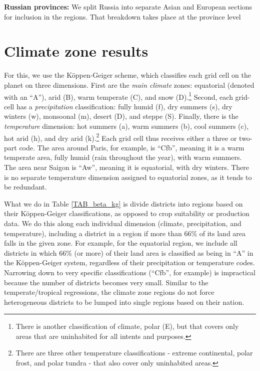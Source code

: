 \documentclass[11pt]{article}
\begin{document}
\noindent\textbf{Russian provinces:} We split Russia into separate Asian and European sections for inclusion in the regions. That breakdown takes place at the province level
\begin{itemize}
    \setlength\itemsep{0pt}
    
\end{itemize}

\section{Climate zone results}
For this, we use the K{\"o}ppen-Geiger scheme, which classifies each grid cell on the planet on three dimensions. First are the \textit{main climate} zones: equatorial (denoted with an ``A''), arid (B), warm temperate (C), and snow (D).\footnote{There is another classification of climate, polar (E), but that covers only areas that are uninhabited for all intents and purposes.} Second, each grid-cell has a \textit{precipitation} classification: fully humid (f), dry summers (s), dry winters (w), monsoonal (m), desert (D), and steppe (S). Finally, there is the \textit{temperature} dimension: hot summers (a), warm summers (b), cool summers (c), hot arid (h), and dry arid (k).\footnote{There are three other temperature classifications - extreme continental, polar frost, and polar tundra - that also cover only uninhabited areas.} Each grid cell thus receives either a three or two-part code. The area around Paris, for example, is ``Cfb'', meaning it is a warm temperate area, fully humid (rain throughout the year), with warm summers. The area near Saigon is ``Aw'', meaning it is equatorial, with dry winters. There is no separate temperature dimension assigned to equatorial zones, as it tends to be redundant.

What we do in Table \ref{TAB_beta_kg} is divide districts into regions based on their K{\"o}ppen-Geiger classifications, as opposed to crop suitability or production data. We do this along each individual dimension (climate, precipitation, and temperature), including a district in a region if more than 66\% of its land area falls in the given zone. For example, for the equatorial region, we include all districts in which 66\% (or more) of their land area is classified as being in ``A'' in the K{\"o}ppen-Geiger system, regardless of their precipitation or temperature codes. Narrowing down to very specific classifications (``Cfb'', for example) is impractical because the number of districts becomes very small. Similar to the temperate/tropical regressions, the climate zone regions do not force heterogeneous districts to be lumped into single regions based on their nation. 
\end{document}
